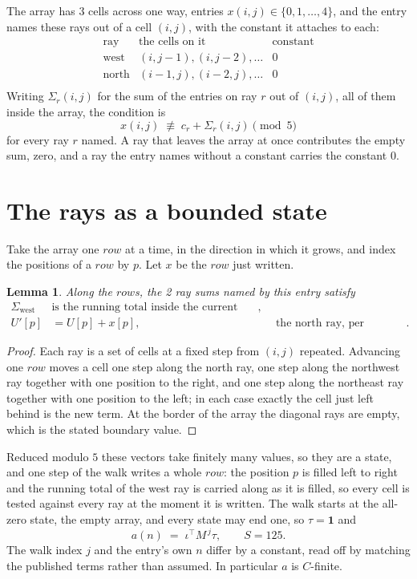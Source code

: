 \documentclass[11pt,a4paper]{article}
\theoremstyle{plain}
\newtheorem{lemma}[theorem]{Lemma}
\theoremstyle{definition}
\begin{document}
The array has $3$ cells across one way, entries $x(i,j)\in\{0,1,\dots,4\}$, and the entry names these
rays out of a cell $(i,j)$, with the constant it attaches to each:
\[
\begin{array}{lll}
\text{ray} & \text{the cells on it} & \text{constant} \\[2pt]
\text{west} & (i,j-1),(i,j-2),\dots & 0 \\
\text{north} & (i-1,j),(i-2,j),\dots & 0 \\
\end{array}
\]
Writing $\Sigma_r(i,j)$ for the sum of the entries on ray $r$ out of $(i,j)$, all of them
inside the array, the condition is
\[
x(i,j)\;\not\equiv\;c_r+\Sigma_r(i,j) \pmod{5}
\]
for every ray $r$ named. A ray that leaves the array at once contributes the empty sum,
zero, and a ray the entry names without a constant carries the constant $0$.

\section{The rays as a bounded state}

Take the array one $row$ at a time, in the direction in which it grows, and index the
positions of a $row $ by $p$. Let $x$ be the $row$ just written.

\begin{lemma}\label{lem:rays}
Along the $row$s, the 2 ray sums named by this entry satisfy
\[
\begin{aligned}
\Sigma_{\mathrm{west}}\ &\text{is the running total inside the current row},\\
U'[p]&=U[p]+x[p], &&\text{the north ray, per position} .
\end{aligned}
\]
\end{lemma}

\begin{proof}
Each ray is a set of cells at a fixed step from $(i,j)$ repeated. Advancing one $row$
moves a cell one step along the north ray, one step along the northwest ray together with one
position to the right, and one step along the northeast ray together with one position to the
left; in each case exactly the cell just left behind is the new term. At the border of the
array the diagonal rays are empty, which is the stated boundary value.
\end{proof}

Reduced modulo $5$ these vectors take finitely many values, so they are a state, and one step
of the walk writes a whole $row$: the position $p$ is filled left to right and the
running total of the west ray is carried along as it is filled, so every cell is tested
against every ray at the moment it is written. The walk starts at the all-zero state, the empty
array, and every state may end one, so $\tau=\mathbf{1}$ and
\[
a(n)\;=\;\iota^{\!\top}M^{\,j}\tau ,\qquad S=125.
\]
The walk index $j$ and the entry's own $n$ differ by a constant, read off by matching the
published terms rather than assumed. In particular $a$ is $C$-finite.
\end{document}
